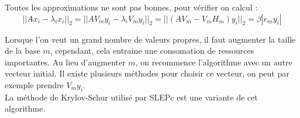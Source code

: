 Toutes les approximations ne sont pas bonnes, pour vérifier on calcul :
\[ ||Ax_i-\lambda_ix_i||_2 = ||AV_my_i-\lambda_iV_my_i||_2 = ||(AV_m-V_mH_m)y_i||_2 = \beta|e_my_i| \]

Lorsque l'on veut un grand nombre de valeurs propres, il faut augmenter la taille de la base $m$, cependant, cela entraine une consomation de ressources importantes. Au lieu d'augmenter $m$, on recommence l'algorithme avec un autre vecteur initial. Il existe plusieurs méthodes pour choisir ce vecteur, on peut par exemple prendre $V_my_i$.\\

La méthode de Krylov-Schur utilisé par SLEPc est une variante de cet algorithme.

